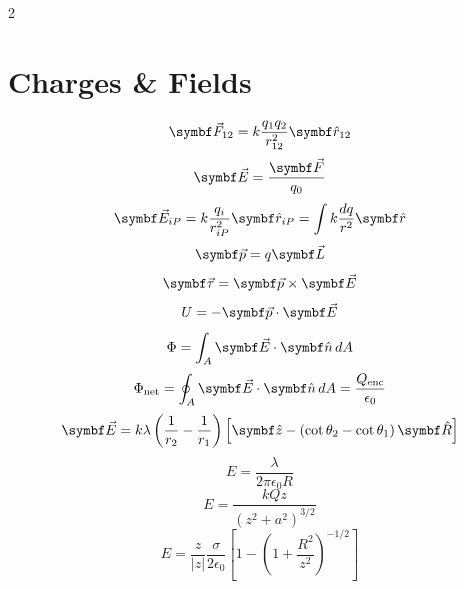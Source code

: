 \begin{multicols*}{2}

\section{Charges \& Fields}

\begin{equation*}
    \bvec{F}_{12} = k\frac{q_1 q_2}{r_{12}^2} \bhat{r}_{12}
\end{equation*}
\begin{equation*}
    \bvec{E} = \frac{\bvec{F}}{q_0}
\end{equation*}
\begin{equation*}
    \bvec{E}_{iP} = k\frac{q_i}{r_{iP}^2} \bhat{r}_{iP} =
    \int k \frac{dq}{r^2}\bhat{r}
\end{equation*}
\begin{equation*}
    \bvec{p} = q\bvec{L}
\end{equation*}
\begin{equation*}
    \bvec{\tau} = \bvec{p} \times \bvec{E}
\end{equation*}
\begin{equation*}
    U = -\bvec{p} \cdot \bvec{E}
\end{equation*}
\begin{equation*}
    \Phi = \int_A \bvec{E} \cdot \bhat{n} \, dA
\end{equation*}
\begin{equation*}
    \Phi_\mathrm{net} = \oint_A \bvec{E} \cdot \bhat{n} \, dA = \frac{Q_\mathrm{enc}}{\epsilon_0}
\end{equation*}
\begin{equation*}
    \bvec{E} = k\lambda \left( \frac{1}{r_2} - \frac{1}{r_1} \right)
    \left[ \bhat{z} - \left( \cot\theta_2 - \cot\theta_1 \right)\bhat{R} \right]
\end{equation*}
\begin{equation*}
    E = \frac{\lambda}{2\pi\epsilon_0 R}
\end{equation*}
\begin{equation*}
    E = \frac{k Q z}{\left( z^2 + a^2 \right)^{3/2}}
\end{equation*}
\begin{equation*}
    E =\frac{z}{\lvert z \rvert} \frac{\sigma}{2\epsilon_0} \left[
        1 - \left( 1 + \frac{R^2}{z^2} \right)^{-1/2}
    \right]
\end{equation*}


\end{multicols*}

